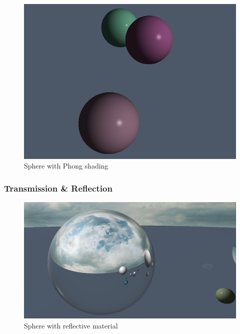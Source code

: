 \documentclass[final]{cmpreport}
\begin{document}
\begin{figure}
    \centering
    \includegraphics[width=\textwidth]{img/phong.png}
    \caption{Sphere with Phong shading}
    \label{phong_img}
\end{figure}

\subsubsection{Transmission \& Reflection}

\begin{figure}
    \centering
    \includegraphics[width=\textwidth]{img/reflection.png}
    \caption{Sphere with reflective material}
    \label{sphere_reflect}
\end{figure}
\end{document}

